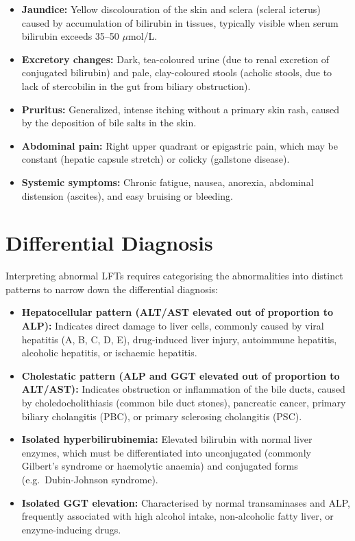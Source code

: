 \begin{itemize}
    \item \textbf{Jaundice:} Yellow discolouration of the skin and sclera (scleral icterus) caused by accumulation of bilirubin in tissues, typically visible when serum bilirubin exceeds 35--50 $\mu$mol/L.
    \item \textbf{Excretory changes:} Dark, tea-coloured urine (due to renal excretion of conjugated bilirubin) and pale, clay-coloured stools (acholic stools, due to lack of stercobilin in the gut from biliary obstruction).
    \item \textbf{Pruritus:} Generalized, intense itching without a primary skin rash, caused by the deposition of bile salts in the skin.
    \item \textbf{Abdominal pain:} Right upper quadrant or epigastric pain, which may be constant (hepatic capsule stretch) or colicky (gallstone disease).
    \item \textbf{Systemic symptoms:} Chronic fatigue, nausea, anorexia, abdominal distension (ascites), and easy bruising or bleeding.
\end{itemize}

\section*{Differential Diagnosis}
Interpreting abnormal LFTs requires categorising the abnormalities into distinct patterns to narrow down the differential diagnosis:

\begin{itemize}
    \item \textbf{Hepatocellular pattern (ALT/AST elevated out of proportion to ALP):} Indicates direct damage to liver cells, commonly caused by viral hepatitis (A, B, C, D, E), drug-induced liver injury, autoimmune hepatitis, alcoholic hepatitis, or ischaemic hepatitis.
    \item \textbf{Cholestatic pattern (ALP and GGT elevated out of proportion to ALT/AST):} Indicates obstruction or inflammation of the bile ducts, caused by choledocholithiasis (common bile duct stones), pancreatic cancer, primary biliary cholangitis (PBC), or primary sclerosing cholangitis (PSC).
    \item \textbf{Isolated hyperbilirubinemia:} Elevated bilirubin with normal liver enzymes, which must be differentiated into unconjugated (commonly Gilbert's syndrome or haemolytic anaemia) and conjugated forms (e.g.\ Dubin-Johnson syndrome).
    \item \textbf{Isolated GGT elevation:} Characterised by normal transaminases and ALP, frequently associated with high alcohol intake, non-alcoholic fatty liver, or enzyme-inducing drugs.
\end{itemize}

